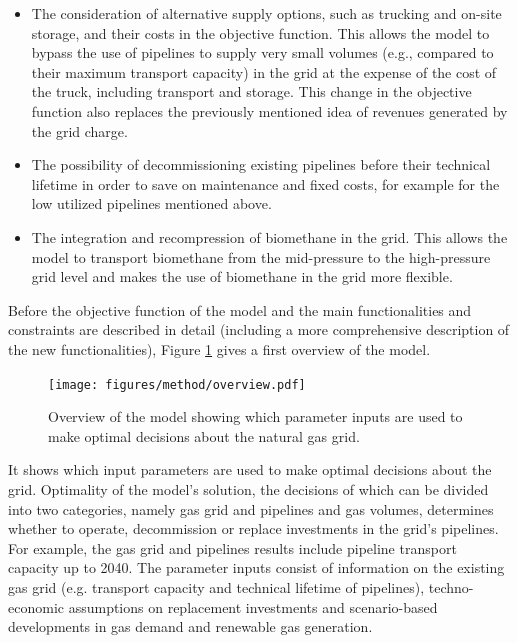 \begin{itemize}
	\item The consideration of alternative supply options, such as trucking and on-site storage, and their costs in the objective function. This allows the model to bypass the use of pipelines to supply very small volumes (e.g., compared to their maximum transport capacity) in the grid at the expense of the cost of the truck, including transport and storage. This change in the objective function also replaces the previously mentioned idea of revenues generated by the grid charge. 
	\item The possibility of decommissioning existing pipelines before their technical lifetime in order to save on maintenance and fixed costs, for example for the low utilized pipelines mentioned above. 
	\item The integration and recompression of biomethane in the grid. This allows the model to transport biomethane from the mid-pressure to the high-pressure grid level and makes the use of biomethane in the grid more flexible. 
\end{itemize}

Before the objective function of the model and the main functionalities and constraints are described in detail (including a more comprehensive description of the new functionalities), Figure \ref{method:overview} gives a first overview of the model. 

 \begin{figure}[h]
 	\centering
 	\texttt{[image: figures/method/overview.pdf]}
 	\caption{Overview of the model showing which parameter inputs are used to make optimal decisions about the natural gas grid.}
 	\label{method:overview}
 \end{figure}
 
It shows which input parameters are used to make optimal decisions about the grid. Optimality of the model's solution, the decisions of which can be divided into two categories, namely gas grid and pipelines and gas volumes, determines whether to operate, decommission or replace investments in the grid's pipelines. For example, the gas grid and pipelines results include pipeline transport capacity up to 2040. The parameter inputs consist of information on the existing gas grid (e.g. transport capacity and technical lifetime of pipelines), techno-economic assumptions on replacement investments and scenario-based developments in gas demand and renewable gas generation.  

